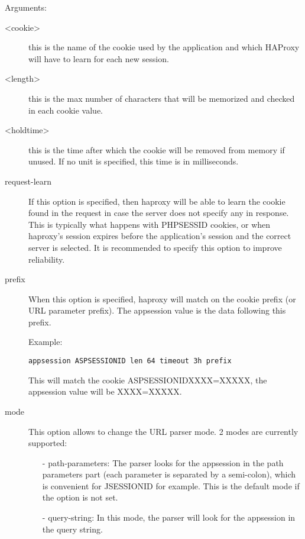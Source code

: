 
  Arguments:
  \begin{description}

  \item[<cookie>]   this is the name of the cookie used by the application and which
               HAProxy will have to learn for each new session.

  \item[<length>]   this is the max number of characters that will be memorized and
               checked in each cookie value.

  \item[<holdtime>] this is the time after which the cookie will be removed from
               memory if unused. If no unit is specified, this time is in
               milliseconds.

  \item[request-learn]
               If this option is specified, then haproxy will be able to learn
               the cookie found in the request in case the server does not
               specify any in response. This is typically what happens with
               PHPSESSID cookies, or when haproxy's session expires before
               the application's session and the correct server is selected.
               It is recommended to specify this option to improve reliability.

  \item[prefix]     When this option is specified, haproxy will match on the cookie
               prefix (or URL parameter prefix). The appsession value is the
               data following this prefix.

               Example:
               
               \verb|appsession ASPSESSIONID len 64 timeout 3h prefix|

               This will match the cookie ASPSESSIONIDXXXX=XXXXX,
               the appsession value will be XXXX=XXXXX.

  \item[mode]       This option allows to change the URL parser mode.
               2 modes are currently supported:
               \begin{itemize}
               \item[-] path-parameters:
                 The parser looks for the appsession in the path parameters
                 part (each parameter is separated by a semi-colon), which is
                 convenient for JSESSIONID for example.
                 This is the default mode if the option is not set.
               \item[-] query-string:
                 In this mode, the parser will look for the appsession in the
                 query string.
              \end{itemize}
  \end{description}

